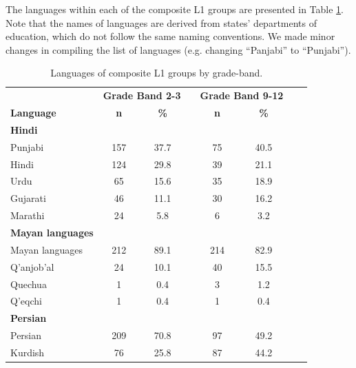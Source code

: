 \documentclass [PhD] {uclathes}
\begin{document}
The languages within each of the composite L1 groups are presented in Table \ref{lang_grp}. Note that the names of languages are derived from states’ departments of education, which do not follow the same naming conventions. We made minor changes in compiling the list of languages (e.g. changing “Panjabi” to “Punjabi”). 

\begin{table}[htbp]
\centering
\caption{\label{lang_grp} Languages of composite L1 groups by grade-band.}
\scriptsize  %
\begin{tabular}{lccccccc}
\toprule
    & \multicolumn{2}{c}{\textbf{Grade Band 2-3}} & \multicolumn{1}{c}{ } & \multicolumn{2}{c}{\textbf{Grade Band 9-12}} \\
    \cline{2-3}
    \cline{5-6}
     \textbf{Language} & \textbf{n} & \textbf{\%} & & \textbf{n} & \textbf{\%} \\
    \midrule
\textbf{Hindi} & & & & & \\
\hspace{3mm} Punjabi & 157 & 37.7 & & 75 & 40.5 \\
\hspace{3mm} Hindi & 124 & 29.8 & & 39 & 21.1 \\
\hspace{3mm} Urdu & 65 & 15.6 & & 35 & 18.9 \\
\hspace{3mm} Gujarati & 46 & 11.1 & & 30 & 16.2 \\
\hspace{3mm} Marathi & 24 & 5.8 & & 6 & 3.2 \\
\textbf{Mayan languages} & & & & & \\
\hspace{3mm} Mayan languages & 212 & 89.1 & & 214 & 82.9 \\
\hspace{3mm} Q'anjob'al & 24 & 10.1 & & 40 & 15.5 \\
\hspace{3mm} Quechua & 1 & 0.4 & & 3 & 1.2 \\
\hspace{3mm} Q'eqchi & 1 & 0.4 & & 1 & 0.4 \\
\textbf{Persian} & & & & & \\
\hspace{3mm} Persian & 209 & 70.8 & & 97 & 49.2 \\
\hspace{3mm} Kurdish & 76 & 25.8 & & 87 & 44.2 \\

\end{tabular}
\end{table}
\end{document}
